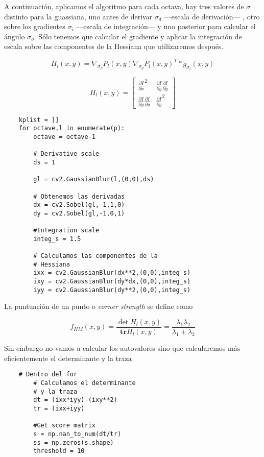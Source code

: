 \documentclass{article}
\begin{document}
A continuación, aplicamos el algoritmo para cada octava, hay tres valores de $\sigma$ distinto para la guassiana, uno antes de derivar $\sigma_d$ ---escala de derivación--- , otro sobre los gradientes $\sigma_i$ ---escala de integración--- y uno posterior para calcular el ángulo $\sigma_o$. Sólo tenemos que calcular el gradiente y aplicar la integración de escala sobre las componentes de la Hessiana que utilizaremos después.

\[H_l(x,y) = \nabla_{\sigma_d}P_l(x,y)\nabla_{\sigma_d}P_l(x,y)^T * g_{\sigma_i}(x,y)\]

\[ H_l(x,y) = \begin{bmatrix}
\frac{\partial I}{\partial x}^2 & \frac{\partial I}{\partial y} \frac{\partial I}{\partial y}\\ 
\frac{\partial I}{\partial y} \frac{\partial I}{\partial y} & \frac{\partial I}{\partial y}^2 
\end{bmatrix} \]

\begin{lstlisting}
    kplist = []
    for octave,l in enumerate(p):
        octave = octave-1
        
        # Derivative scale
        ds = 1
        
        gl = cv2.GaussianBlur(l,(0,0),ds)
        
        # Obtenemos las derivadas
        dx = cv2.Sobel(gl,-1,1,0)
        dy = cv2.Sobel(gl,-1,0,1)

        #Integration scale
        integ_s = 1.5

        # Calculamos las componentes de la 
        # Hessiana
        ixx = cv2.GaussianBlur(dx**2,(0,0),integ_s)
        ixy = cv2.GaussianBlur(dy*dx,(0,0),integ_s)
        iyy = cv2.GaussianBlur(dy**2,(0,0),integ_s)
\end{lstlisting}

La puntuación de un punto o \textit{corner strength} se define como

\[ f_{HM}(x,y) = \frac{\det H_l(x,y)}{\mathbf{tr } H_l(x,y)} = \frac{\lambda_1 \lambda_2}{\lambda_1 + \lambda_2}\]

Sin embargo no vamos a calcular los autovalores sino que calcularemos más eficientemente el determinante y la traza

\begin{lstlisting}
    # Dentro del for
        # Calculamos el determinante
        # y la traza
        dt = (ixx*iyy)-(ixy**2)
        tr = (ixx+iyy)

        #Get score matrix
        s = np.nan_to_num(dt/tr)
        ss = np.zeros(s.shape)
        threshold = 10
\end{lstlisting}
\end{document}
